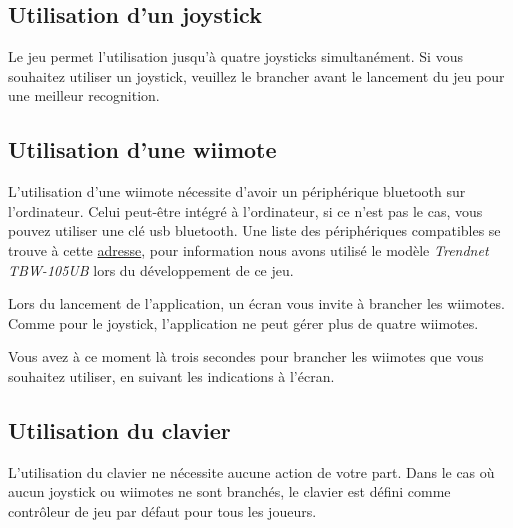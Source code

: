 \subsection{Utilisation d'un joystick}
	Le jeu permet l'utilisation jusqu'à quatre joysticks simultanément. Si vous souhaitez utiliser un joystick, veuillez le brancher avant le lancement du jeu pour une meilleur recognition.
	
\subsection{Utilisation d'une wiimote}

	L'utilisation d'une wiimote nécessite d'avoir un périphérique bluetooth sur l'ordinateur. Celui peut-être intégré à l'ordinateur, si ce n'est pas le cas, vous pouvez utiliser une clé usb bluetooth. Une liste des périphériques compatibles se trouve à cette \href{http://wiibrew.org/wiki/List_of_Working_Bluetooth_Devices}{adresse}, pour information nous avons utilisé le modèle \textit{Trendnet TBW-105UB} lors du développement de ce jeu.
	
	
	Lors du lancement de l'application, un écran vous invite à brancher les wiimotes. Comme pour le joystick, l'application ne peut gérer plus de quatre wiimotes.
		
	Vous avez à ce moment là trois secondes pour brancher les wiimotes que vous souhaitez utiliser, en suivant les indications à l'écran.
	

\subsection{Utilisation du clavier}

L'utilisation du clavier ne nécessite aucune action de votre part. Dans le cas où aucun joystick ou wiimotes ne sont branchés, le clavier est défini comme contrôleur de jeu par défaut pour tous les joueurs.